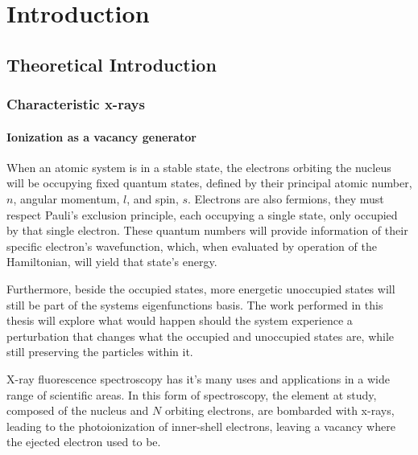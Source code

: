 
%

\chapter{Introduction}\label{cha:introduction}

\section{Theoretical Introduction}
\subsection{Characteristic x-rays}

\subsubsection{Ionization as a vacancy generator}

When an atomic system is in a stable state, the electrons orbiting the nucleus will be occupying fixed quantum states, defined by their principal atomic number, $n$, angular momentum, $l$, and spin, $s$. Electrons are also fermions, they must respect Pauli's exclusion principle, each occupying a single state, only occupied by that single electron.
 These quantum numbers will provide information of their specific electron's wavefunction, which, when evaluated by operation of the Hamiltonian, will yield that state's energy.

Furthermore, beside the occupied states, more energetic unoccupied states will still be part of the systems eigenfunctions basis. The work performed in this thesis will explore what would happen should the system experience a perturbation that changes what the occupied and unoccupied states are, while still preserving the particles within it.


X-ray fluorescence spectroscopy has it's many uses and applications in a wide range of scientific areas. In this form of spectroscopy, the element at study, composed of the nucleus and $N$ orbiting electrons, are bombarded with x-rays, leading to the photoionization of inner-shell electrons, leaving a vacancy where the ejected electron used to be.

